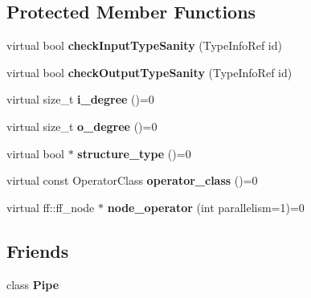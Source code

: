 \subsection*{\-Protected \-Member \-Functions}
\begin{DoxyCompactItemize}
\item 
\hypertarget{class_binary_operator_a2de8a96fc037a231f39b3118069f5b08}{virtual bool {\bfseries check\-Input\-Type\-Sanity} (\-Type\-Info\-Ref id)}\label{class_binary_operator_a2de8a96fc037a231f39b3118069f5b08}

\item 
\hypertarget{class_binary_operator_a90a60672775f8d7958dda0600c5ed546}{virtual bool {\bfseries check\-Output\-Type\-Sanity} (\-Type\-Info\-Ref id)}\label{class_binary_operator_a90a60672775f8d7958dda0600c5ed546}

\item 
\hypertarget{class_binary_operator_a97a69de42fae8bab00c814459ea844b0}{virtual size\-\_\-t {\bfseries i\-\_\-degree} ()=0}\label{class_binary_operator_a97a69de42fae8bab00c814459ea844b0}

\item 
\hypertarget{class_binary_operator_aee9650145b55dfcd040042d9be249171}{virtual size\-\_\-t {\bfseries o\-\_\-degree} ()=0}\label{class_binary_operator_aee9650145b55dfcd040042d9be249171}

\item 
\hypertarget{class_binary_operator_a2fc538f30e110d6313bad1066236143b}{virtual bool $\ast$ {\bfseries structure\-\_\-type} ()=0}\label{class_binary_operator_a2fc538f30e110d6313bad1066236143b}

\item 
\hypertarget{class_binary_operator_a8c247face4b17579873d45b4b14df527}{virtual const \-Operator\-Class {\bfseries operator\-\_\-class} ()=0}\label{class_binary_operator_a8c247face4b17579873d45b4b14df527}

\item 
\hypertarget{class_binary_operator_a4f5525e020f66def454089a8aa128fda}{virtual ff\-::ff\-\_\-node $\ast$ {\bfseries node\-\_\-operator} (int parallelism=1)=0}\label{class_binary_operator_a4f5525e020f66def454089a8aa128fda}

\end{DoxyCompactItemize}
\subsection*{\-Friends}
\begin{DoxyCompactItemize}
\item 
\hypertarget{class_binary_operator_adb788d0aa2d64624d3602a985936d7da}{class {\bfseries \-Pipe}}\label{class_binary_operator_adb788d0aa2d64624d3602a985936d7da}

\end{DoxyCompactItemize}


